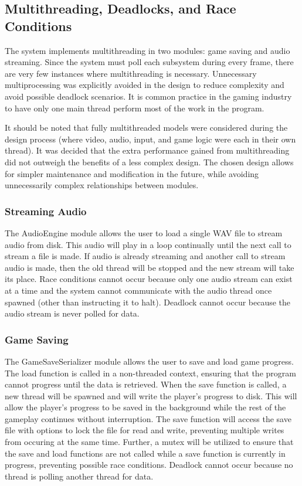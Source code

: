\documentclass{article}
\begin{document}
	\subsection{Multithreading, Deadlocks, and Race Conditions}
    The system implements multithreading in two modules: game saving and audio streaming. Since the system must poll each subsystem during every frame, there are very few instances where multithreading is necessary. Unnecessary multiprocessing was explicitly avoided in the design to reduce complexity and avoid possible deadlock scenarios. It is common practice in the gaming industry to have only one main thread perform most of the work in the program.

    It should be noted that fully multithreaded models were considered during the design process (where video, audio, input, and game logic were each in their own thread). It was decided that the extra performance gained from multithreading did not outweigh the benefits of a less complex design. The chosen design allows for simpler maintenance and modification in the future, while avoiding unnecessarily complex relationships between modules.

    \subsubsection{Streaming Audio}
      The AudioEngine module allows the user to load a single WAV file to stream audio from disk. This audio will play in a loop continually until the next call to stream a file is made. If audio is already streaming and another call to stream audio is made, then the old thread will be stopped and the new stream will take its place. Race conditions cannot occur because only one audio stream can exist at a time and the system cannot communicate with the audio thread once spawned (other than instructing it to halt). Deadlock cannot occur because the audio stream is never polled for data.

    \subsubsection{Game Saving}
      The GameSaveSerializer module allows the user to save and load game progress. The load function is called in a non-threaded context, ensuring that the program cannot progress until the data is retrieved. When the save function is called, a new thread will be spawned and will write the player's progress to disk. This will allow the player's progress to be saved in the background while the rest of the gameplay continues without interruption. The save function will access the save file with options to lock the file for read and write, preventing multiple writes from occuring at the same time. Further, a mutex will be utilized to ensure that the save and load functions are not called while a save function is currently in progress, preventing possible race conditions. Deadlock cannot occur because no thread is polling another thread for data.
\end{document}
